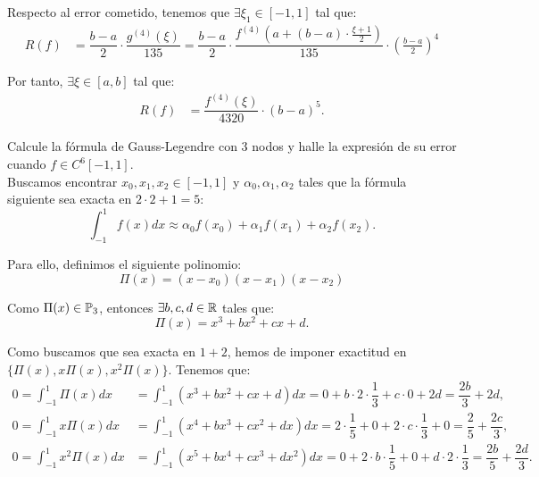 \begin{ejercicio}
\begin{enumerate}
        Respecto al error cometido, tenemos que $\exists \xi_1 \in [-1, 1]$ tal que:
        \begin{align*}
            R(f) &= \dfrac{b-a}{2}\cdot \dfrac{g^{(4)}(\xi)}{135} 
            = \dfrac{b-a}{2}\cdot \dfrac{f^{(4)}\left(a + (b-a)\cdot \frac{\xi+1}{2}\right)}{135}\cdot \left(\frac{b-a}{2}\right)^4
        \end{align*}

        Por tanto, $\exists \xi \in [a, b]$ tal que:
        \begin{align*}
            R(f) &= \dfrac{f^{(4)}(\xi)}{4320} \cdot (b-a)^5.
        \end{align*}
    \end{enumerate}
\end{ejercicio}

\begin{ejercicio}\label{ej:2.1.24}
    Calcule la fórmula de Gauss-Legendre con 3 nodos y halle la expresión de su error cuando $f \in C^6[-1, 1]$.\\


    Buscamos encontrar $x_0,x_1,x_2\in [-1, 1]$ y $\alpha_0, \alpha_1, \alpha_2$ tales que la fórmula siguiente sea exacta en $2\cdot 2+1 = 5$:
    \begin{equation*}
        \int_{-1}^{1} f(x) dx \approx \alpha_0 f(x_0) + \alpha_1 f(x_1) + \alpha_2 f(x_2).
    \end{equation*}

    Para ello, definimos el siguiente polinomio:
    \begin{equation*}
        \Pi(x) = (x-x_0)(x-x_1)(x-x_2)
    \end{equation*}

    Como $\Pi(x)\in \mathbb{P}_3$, entonces $\exists b,c,d\in \mathbb{R}$ tales que:
    \begin{equation*}
        \Pi(x) = x^3 + bx^2 + cx + d.
    \end{equation*}

    Como buscamos que sea exacta en $1+2$, hemos de imponer exactitud en $\{\Pi(x), x\Pi(x), x^2\Pi(x)\}$. Tenemos que:
    \begin{align*}
        0 = \int_{-1}^{1} \Pi(x) dx &= \int_{-1}^{1} (x^3 + bx^2 + cx + d) dx = 0 + b\cdot 2\cdot \dfrac{1}{3} + c\cdot 0 + 2d = \dfrac{2b}{3} + 2d,\\
        0 = \int_{-1}^{1} x\Pi(x) dx &= \int_{-1}^{1} (x^4 + bx^3 + cx^2 + dx) dx = 2\cdot \dfrac{1}{5} + 0 + 2\cdot c\cdot \dfrac{1}{3} + 0 = \dfrac{2}{5} + \dfrac{2c}{3},\\
        0 = \int_{-1}^{1} x^2\Pi(x) dx &= \int_{-1}^{1} (x^5 + bx^4 + cx^3 + dx^2) dx = 0 + 2\cdot b\cdot \dfrac{1}{5} + 0 + d\cdot 2\cdot \dfrac{1}{3} = \dfrac{2b}{5} + \dfrac{2d}{3}.
    \end{align*}


\end{ejercicio}
